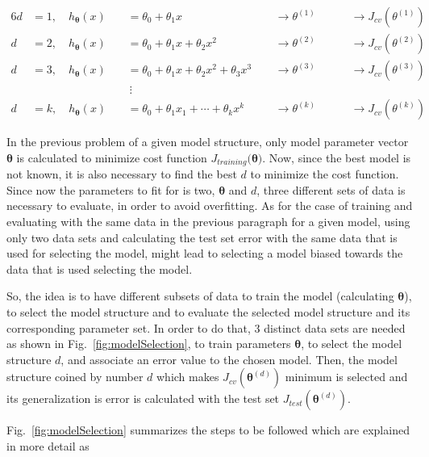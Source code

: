 \begin{alignat*}{6}
\label{eqn:exampCostFunc}
d &= 1, \quad h_{{\bm{\theta}}}(x) \ && = \theta_0 + \theta_1 x\ \ && \longrightarrow \theta^{(1)}\ \ && \quad \longrightarrow J_{cv}(\theta^{(1)})\
\\
d &= 2, \quad h_{{\bm{\theta}}}(x) \ && = \theta_0 + \theta_1 x + \theta_2 x^2 \ \ && \longrightarrow \theta^{(2)}\ \ && \quad \longrightarrow J_{cv}(\theta^{(2)})\
\\
d &= 3, \quad h_{{\bm{\theta}}}(x) \ && = \theta_0 + \theta_1 x + \theta_2 x^2 + \theta_3 x^3\ \ && \longrightarrow \theta^{(3)}\ \ && \quad \longrightarrow J_{cv}(\theta^{(3)})\
\\
& \ &&\ \vdots \ &&\ \ &&\ 
\\
d &= k, \quad h_{{\bm{\theta}}}(x) \ && = \theta_0 + \theta_1 x_1 + \cdots+ \theta_k x^k\ \ && \longrightarrow \theta^{(k)}\ \ && \quad \longrightarrow J_{cv}(\theta^{(k)})\
\end{alignat*}

In the previous problem of a given model structure, only model parameter vector $\bm{\theta}$ is calculated to minimize cost function $J_{training}(\bm{\theta)}$.
Now, since the best model is not known, it is also necessary to find the best $d$ to minimize the cost function. 
Since now the parameters to fit for is two, $\bm{\theta}$ and $d$, three different sets of data is necessary to evaluate, in order to avoid overfitting.
As for the case of training and evaluating with the same data in the previous paragraph for a given model, using only two data sets and calculating the test set error with the same data that is used for selecting the model, might lead to selecting a model biased towards the data that is used selecting the model.
 
So, the idea is to have different subsets of data to train the model (calculating ${\bm{\theta}}$), to select the model structure and to evaluate the selected model structure and its corresponding parameter set. 
In order to do that, 3 distinct data sets are needed as shown in Fig.~\ref{fig:modelSelection}, to train parameters ${\bm{\theta}}$, to select the model structure $d$, and associate an error value to the chosen model. 
Then, the model structure coined by number $d$ which makes $J_{cv}({\bm{\theta}}^{(d)})$ minimum is selected and its generalization is error is calculated with the test set $J_{test}({\bm{\theta}}^{(d)})$.

Fig.~\ref{fig:modelSelection} summarizes the steps to be followed which are explained in more detail as

